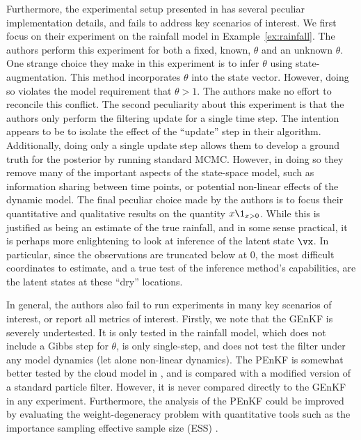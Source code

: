 \documentclass[12pt]{article}
\begin{document}
Furthermore, the experimental setup presented in \cite{katzfuss2020} has
several peculiar implementation details, and fails to address key scenarios of
interest. We first focus on their experiment on the rainfall model in
Example~\ref{ex:rainfall}.  The authors perform this experiment for both a
fixed, known, $\theta$ and an unknown $\theta$. One strange choice they make
in this experiment is to infer $\theta$ using state-augmentation. This method
incorporates $\theta$ into the state vector. However, doing so violates the
model requirement that $\theta > 1$. The authors make no effort to reconcile
this conflict. The second peculiarity about this experiment is that the
authors only perform the filtering update for a single time step. The intention
appears to be to isolate the effect of the ``update'' step in their algorithm.
Additionally, doing only a single update step allows them to develop a ground
truth for the posterior by running standard MCMC. However, in doing so they
remove many of the important aspects of the state-space model, such as
information sharing between time points, or potential non-linear effects of
the dynamic model. The final peculiar choice made by the authors is to focus
their quantitative and qualitative results on the quantity $x \1_{x > 0}$. While
this is justified as being an estimate of the true rainfall, and in some sense
practical, it is perhaps more enlightening to look at inference of the latent
state $\vx$. In particular, since the observations are truncated below at $0$,
the most difficult coordinates to estimate, and a true test of the inference
method's capabilities, are the latent states at these ``dry''
locations.

In general, the authors also fail to run experiments in many key scenarios of
interest, or report all metrics of interest. Firstly, we note that the GEnKF
is severely undertested. It is only tested in the rainfall model, which does 
not include a Gibbs step for $\theta$, is only single-step, and does not
test the filter under any model dynamics (let alone non-linear dynamics).
The PEnKF is somewhat better tested by the cloud model in
\cite{katzfuss2020}, and is compared with a modified version of a standard
particle filter. However, it is never compared directly to the GEnKF in any
experiment. Furthermore, the analysis of the PEnKF could be improved by
evaluating the weight-degeneracy problem with quantitative tools such as the
importance sampling effective sample size (ESS) \cite{kong1994,kong1992,chopin2020}.

% 
\end{document}
